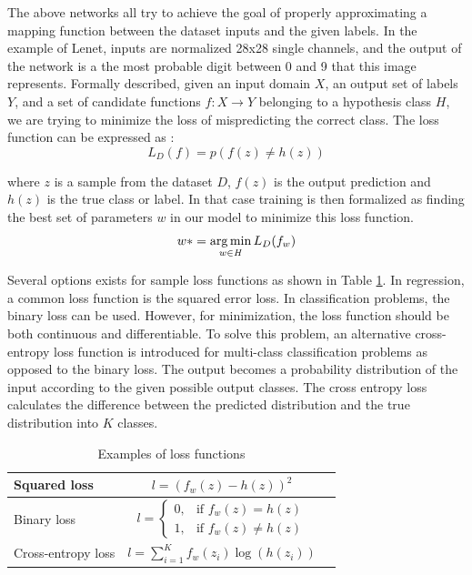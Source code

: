 The above networks all try to achieve the goal of properly approximating a mapping function between the dataset inputs and the given labels. In the example of Lenet, inputs are normalized 28x28 single channels, and the output of the network is a the most probable digit between 0 and 9 that this image represents. Formally described, given an input domain $\mathit{X}$, an output set of labels $\mathit{Y}$, and a set of candidate functions $\mathit{f : X \rightarrow Y}$ belonging to a hypothesis class $\mathit{H}$, we are trying to minimize the loss of mispredicting the correct class. The loss function can be expressed as :
\begin{equation}
L_D(f) = p( f(z) \neq h(z)) 
\end{equation} 
 
 where $\mathit{z}$ is a sample from the dataset $\mathit{D}$,  $\mathit{f(z)}$ is the output prediction and $\mathit{h(z)}$ is the true class or label. In that case training is then formalized as finding the best set of parameters $\mathit{w}$ in our model to minimize this loss function. 
\begin{equation}
 w* = \operatorname*{arg\,min}\limits_{ w \in \mathit{H} } L_D(f_w)
 \end{equation}

Several options exists for sample loss functions as shown in Table \ref{tab:loss}. In regression, a common loss function is the squared error loss. In classification problems, the binary loss can be used. However, for minimization, the loss function should be both continuous and differentiable. To solve this problem, an alternative cross-entropy loss function is introduced for multi-class classification problems as opposed to the binary loss. The output becomes a probability distribution of the input according to the given possible output classes. The cross entropy loss calculates the difference between the predicted distribution and the true distribution into $\mathit{K}$ classes.

\begin{table}[h!]
	\centering
	\begin{tabular}{| l | c | r |}
		 \hline
	Squared loss 	& $l=(f_{w}(z)-h(z))^{2}$  \\ \hline
	Binary loss 	&  $l=\left\{\begin{array}{cl} 0, & \mbox{if }f_{w}(z)=h(z)\\ 1, & \mbox{if }f_{w}(z) \neq h(z) \end{array}\right.  $ \\ \hline
	Cross-entropy loss 	& $l=\sum_{i=1}^{K}f_{w}(z_{i})\log(h(z_{i}))$  \\
	 \hline
	\end{tabular}
\caption{Examples of loss functions}
\label{tab:loss}
\end{table}


